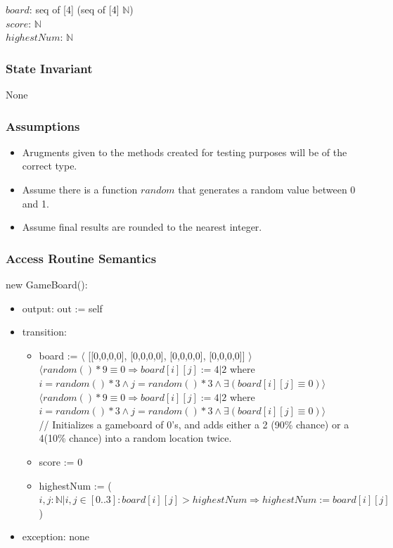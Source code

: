 \documentclass[12pt]{article}
\begin{document}
$board$: seq of [4] (seq of [4] $\mathbb{N}$) \\
$score$: $\mathbb{N}$\\
$highestNum$: $\mathbb{N}$

\subsubsection* {State Invariant}

None

\subsubsection*{Assumptions}

\begin{itemize}
    \item Arugments given to the methods created for testing purposes will be of the
    correct type.
    \item Assume there is a function $random$ that generates a random value
    between 0 and 1. 
    \item Assume final results are rounded to the nearest integer.
\end{itemize}

\subsubsection*{Access Routine Semantics}

\noindent new GameBoard():
\begin{itemize}
    \item output: out := self 
    \item transition: 
    \begin{itemize}
        \item board := $\langle$ [[0,0,0,0], [0,0,0,0], [0,0,0,0],
        [0,0,0,0]] $\rangle$\\
        \phantom{board := }$\langle random() * 9 \equiv 0 \Rightarrow
       board[i][j] := 4 | 2$ where $i = random() * 3 \land j = random() * 3
       \land \exists(board[i][j] \equiv 0)\rangle$\\
       \phantom{board := }$\langle random() * 9 \equiv 0 \Rightarrow
       board[i][j] := 4 | 2$ where $i = random() * 3 \land j = random() * 3
       \land \exists(board[i][j] \equiv 0)\rangle$\\
       // Initializes a gameboard of 0's, and adds either a 2 (90\% chance)
       or a 4(10\% chance) into a random location twice.
        \item score := 0
        \item highestNum := ($i,j : \mathbb{N} \vert i,j \in [0..3] :
        board[i][j] > highestNum \Rightarrow highestNum := board[i][j]$)
    \end{itemize}
    \item exception: none
\end{itemize}
\end{document}
